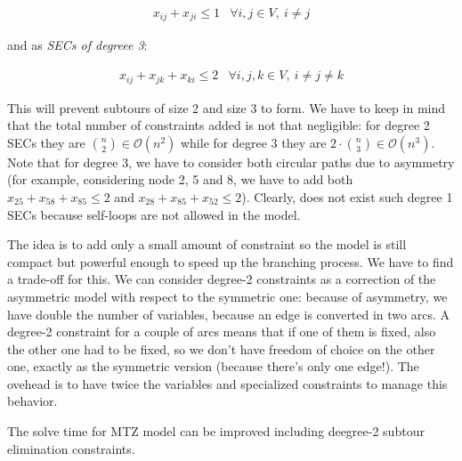 \begin{equation*} 
    \begin{array}{lr} 
        x_{ij} + x_{ji} \leq 1 & \forall i, j \in V,\ i \neq j
    \end{array} 
\end{equation*}

and as \emph{SECs of degreee 3}:

\begin{equation*} 
    \begin{array}{lr} 
        x_{ij} + x_{jk} + x_{ki} \leq 2 & \forall i, j, k \in V,\ i \neq j \neq k
    \end{array} 
\end{equation*}

This will prevent subtours of size 2 and size 3 to form. We have to keep in mind
that the total number of constraints added is not that negligible: for degree 2
SECs they are ${n \choose 2} \in \mathcal{O}(n^2)$ while for degree 3 they are
$2 \cdot {n \choose 3} \in \mathcal{O}(n^3)$. Note that for degree 3, we have to
consider both circular paths due to asymmetry (for example, considering node 2,
5 and 8, we have to add both $x_{25} + x_{58} + x_{85} \leq 2$ and $x_{28} +
x_{85} + x_{52} \leq 2$). Clearly, does not exist such degree 1 SECs because
self-loops are not allowed in the model.

The idea is to add only a small amount of constraint so the model is still
compact but powerful enough to speed up the branching process. We have to find a
trade-off for this. We can consider degree-2 constraints as a correction of the
asymmetric model with respect to the symmetric one: because of asymmetry, we
have double the number of variables, because an edge is converted in two arcs.
A degree-2 constraint for a couple of arcs means that if one of them is fixed,
also the other one had to be fixed, so we don't have freedom of choice on the
other one, exactly as the symmetric version (because there's only one edge!).
The ovehead is to have twice the variables and specialized constraints to manage
this behavior.

\begin{claim} 
    The solve time for MTZ model can be improved including deegree-2 subtour
    elimination constraints. 
\end{claim}

